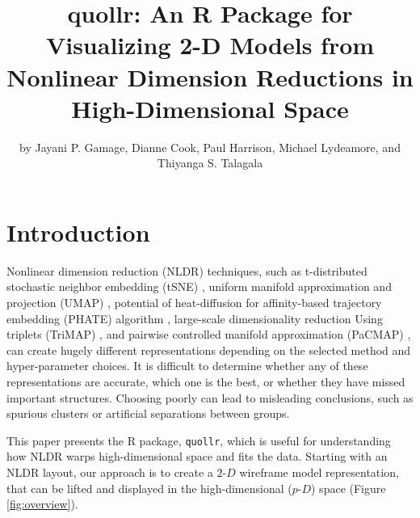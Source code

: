 \title{quollr: An R Package for Visualizing 2-D Models from Nonlinear Dimension Reductions in High-Dimensional Space}


\author{by Jayani P. Gamage, Dianne Cook, Paul Harrison, Michael Lydeamore, and Thiyanga S. Talagala}

\maketitle


\section{Introduction}\label{introduction}

Nonlinear dimension reduction (NLDR) techniques, such as t-distributed stochastic neighbor embedding (tSNE) \citep{laurens2008}, uniform manifold approximation and projection (UMAP) \citep{leland2018}, potential of heat-diffusion for affinity-based trajectory embedding (PHATE) algorithm \citep{moon2019}, large-scale dimensionality reduction Using triplets (TriMAP) \citep{amid2019}, and pairwise controlled manifold approximation (PaCMAP) \citep{yingfan2021}, can create hugely different representations depending on the selected method and hyper-parameter choices. It is difficult to determine whether any of these representations are accurate, which one is the best, or whether they have missed important structures. Choosing poorly can lead to misleading conclusions, such as spurious clusters or artificial separations between groups.

This paper presents the R package, \texttt{quollr}, which is useful for understanding how NLDR warps high-dimensional space and fits the data. Starting with an NLDR layout, our approach is to create a \(2\text{-}D\) wireframe model representation, that can be lifted and displayed in the high-dimensional (\(p\text{-}D\)) space (Figure \ref{fig:overview}).

